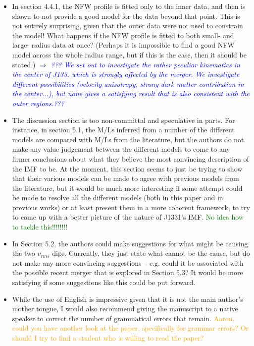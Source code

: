 \documentclass[10pt,a4paper]{article}
\newcommand{\Comment}[1]{\textsl{\textcolor{Blue}{$\Longrightarrow$ {#1}}}}
\newcommand{\Glenn}[1]{\textcolor{Green}{#1}}
\newcommand{\Aaron}[1]{\textcolor{Orange}{#1}}
\begin{document}
\begin{itemize}
\item In section 4.4.1, the NFW profile is fitted only to the inner data, and then is
shown to not provide a good model for the data beyond that point. This is not
entirely surprising, given that the outer data were not used to constrain the model!
What happens if the NFW profile is fitted to both small- and large- radius data at
once? (Perhaps it is impossible to find a good NFW model across the whole radius
range, but if this is the case, then it should be stated.) \Comment{??? We set out to investigate the rather peculiar kinematics in the center of J133, which is strongly affected by the merger. We investigate different possibilities (velocity anisotropy, strong dark matter contribution in the center...), but none gives a satisfying result that is also consistent with the outer regions.??? }

\item The discussion section is too non-committal and speculative in parts. For instance,
in section 5.1, the M/Ls inferred from a number of the different models are compared
with M/Ls from the literature, but the authors do not make any value judgement
between the different models to come to any firmer conclusions about what they
believe the most convincing description of the IMF to be. At the moment, this
section seems to just be trying to show that their various models can be made to
agree with previous models from the literature, but it would be much more
interesting if some attempt could be made to resolve all the different models (both
in this paper and in previous works) or at least present them in a more coherent
framework, to try to come up with a better picture of the nature of J1331's IMF. \Glenn{No idea how to tackle this!!!!!!!!}

\item In Section 5.2, the authors could make suggestions for what might be causing the two
$v_{rms}$ dips. Currently, they just state what cannot be the cause, but do not make any
more convincing suggestions – e.g. could it be associated with the possible recent
merger that is explored in Section 5.3? It would be more satisfying if some
suggestions like this could be put forward.

\item While the use of English is impressive given that it is not the main author's mother
tongue, I would also recommend giving the manuscript to a native speaker to correct
the number of grammatical errors that remain. \Aaron{Aaron, could you have another look at the paper, specifically for grammar errors? Or should I try to find a student who is willing to read the paper?}

\end{itemize}
\end{document}
